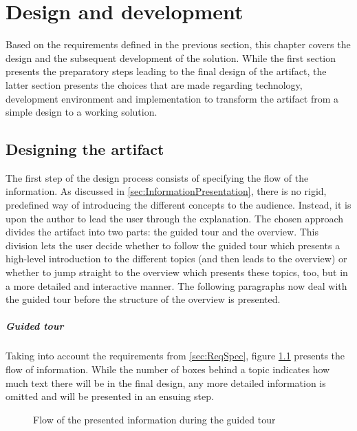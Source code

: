 \chapter{Design and development} \label{chap:designanddev}
Based on the requirements defined in the previous section, this chapter covers the design and the subsequent development of the solution. While the first section presents the preparatory steps leading to the final design of the artifact, the latter section presents the choices that are made regarding technology, development environment and implementation to transform the artifact from a simple design to a working solution.

\section{Designing the artifact} \label{sec:ArtifactDesign}
The first step of the design process consists of specifying the flow of the information. As discussed in \ref{sec:InformationPresentation}, there is no rigid, predefined way of introducing the different concepts to the audience. Instead, it is upon the author to lead the user through the explanation. The chosen approach divides the artifact into two parts: the guided tour and the overview. This division lets the user decide whether to follow the guided tour which presents a high-level introduction to the different topics (and then leads to the overview) or whether to jump straight to the overview which presents these topics, too, but in a more detailed and interactive manner. The following paragraphs now deal with the guided tour before the structure of the overview is presented.

\paragraph{Guided tour} Taking into account the requirements from \ref{sec:ReqSpec}, figure \ref{fig:DesignConcept} presents the flow of information. %
While the number of boxes behind a topic indicates how much text there will be in the final design, any more detailed information is omitted and will be presented in an ensuing step. 

\begin{figure}
 \centering
 
 \caption{Flow of the presented information during the guided tour}
    \label{fig:DesignConcept}
\end{figure}

